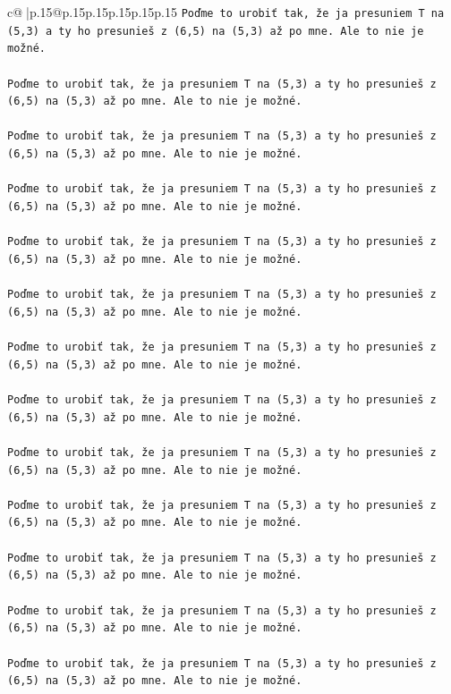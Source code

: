 \documentclass{article}
\begin{document}
{\begin{supertabular}{c@{$\;$}|p{.15\linewidth}@{}p{.15\linewidth}p{.15\linewidth}p{.15\linewidth}p{.15\linewidth}p{.15\linewidth}}
{{{\texttt{Poďme to urobiť tak, že ja presuniem T na (5,3) a ty ho presunieš z (6,5) na (5,3) až po mne. Ale to nie je možné.} \\
\\ 
\texttt{Poďme to urobiť tak, že ja presuniem T na (5,3) a ty ho presunieš z (6,5) na (5,3) až po mne. Ale to nie je možné.} \\
\\ 
\texttt{Poďme to urobiť tak, že ja presuniem T na (5,3) a ty ho presunieš z (6,5) na (5,3) až po mne. Ale to nie je možné.} \\
\\ 
\texttt{Poďme to urobiť tak, že ja presuniem T na (5,3) a ty ho presunieš z (6,5) na (5,3) až po mne. Ale to nie je možné.} \\
\\ 
\texttt{Poďme to urobiť tak, že ja presuniem T na (5,3) a ty ho presunieš z (6,5) na (5,3) až po mne. Ale to nie je možné.} \\
\\ 
\texttt{Poďme to urobiť tak, že ja presuniem T na (5,3) a ty ho presunieš z (6,5) na (5,3) až po mne. Ale to nie je možné.} \\
\\ 
\texttt{Poďme to urobiť tak, že ja presuniem T na (5,3) a ty ho presunieš z (6,5) na (5,3) až po mne. Ale to nie je možné.} \\
\\ 
\texttt{Poďme to urobiť tak, že ja presuniem T na (5,3) a ty ho presunieš z (6,5) na (5,3) až po mne. Ale to nie je možné.} \\
\\ 
\texttt{Poďme to urobiť tak, že ja presuniem T na (5,3) a ty ho presunieš z (6,5) na (5,3) až po mne. Ale to nie je možné.} \\
\\ 
\texttt{Poďme to urobiť tak, že ja presuniem T na (5,3) a ty ho presunieš z (6,5) na (5,3) až po mne. Ale to nie je možné.} \\
\\ 
\texttt{Poďme to urobiť tak, že ja presuniem T na (5,3) a ty ho presunieš z (6,5) na (5,3) až po mne. Ale to nie je možné.} \\
\\ 
\texttt{Poďme to urobiť tak, že ja presuniem T na (5,3) a ty ho presunieš z (6,5) na (5,3) až po mne. Ale to nie je možné.} \\
\\ 
\texttt{Poďme to urobiť tak, že ja presuniem T na (5,3) a ty ho presunieš z (6,5) na (5,3) až po mne. Ale to nie je možné.} \\
}}}
\end{supertabular}}
\end{document}
